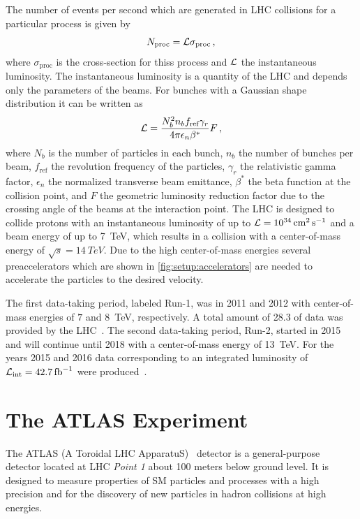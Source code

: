The number of events per second which are generated in LHC collisions for a particular process is given by
\begin{equation}
    \label{eq:lumi:def}
    N_\text{proc} = \mathcal{L} \sigma_\text{proc} \,,
\end{equation}
where $\sigma_\text{proc}$ is the cross-section for thiss process and $\mathcal{L}$ the instantaneous luminosity.
The instantaneous luminosity is a quantity of the LHC and depends only the parameters of the beams.
For bunches with a Gaussian shape distribution it can be written as~\cite{LHC}
\begin{equation}
    \label{eq:lumi:dependencies}
    \mathcal{L} = \frac{N_b^2 n_b f_\text{ref} \gamma_r}{4 \pi \epsilon_n \beta^*} F \,,
\end{equation}
where $N_b$ is the number of particles in each bunch, $n_b$ the number of bunches per beam, $f_\text{ref}$ the revolution
frequency of the particles, $\gamma_r$ the relativistic gamma factor, $\epsilon_n$ the normalized transverse beam emittance,
$\beta^*$ the beta function at the collision point, and $F$ the geometric luminosity reduction factor
due to the crossing angle of the beams at the interaction point.
The LHC is designed to collide protons with an instantaneous luminosity of up to $\lumi = \SI{e34}{\cm\squared\per\second}$
and a beam energy of up to \SI{7}{\TeV}, which results in a collision with a center-of-mass energy of
$\sqrt{s} = \SI{14}{TeV}$.
Due to the high center-of-mass energies several preaccelerators which are shown in \cref{fig:setup:accelerators}
are needed to accelerate the particles to the desired velocity.

The first data-taking period, labeled Run-1, was in 2011 and 2012 with center-of-mass energies of $7$ and
\SI{8}{\TeV}, respectively.
A total amount of \SI{28.3}{\invfb} of data was provided by the LHC~\cite{PublicLumiRun1}.
The second data-taking period, Run-2, started in 2015 and will continue until 2018 with a center-of-mass energy of \SI{13}{TeV}.
For the years 2015 and 2016 data corresponding to an integrated luminosity of $\lumi_\text{int} = \SI{42.7}{\invfb}$ were produced~\cite{PublicLumiRun2}.

\section{The ATLAS Experiment}\label{sec:setup:atlas}

The ATLAS (A Toroidal LHC ApparatuS)~\cite{ATLAS} detector is a general-purpose detector located at LHC \emph{Point 1}
about 100 meters below ground level.
It is designed to measure properties of SM particles and processes with a high precision and for the discovery of new particles
in hadron collisions at high energies.

